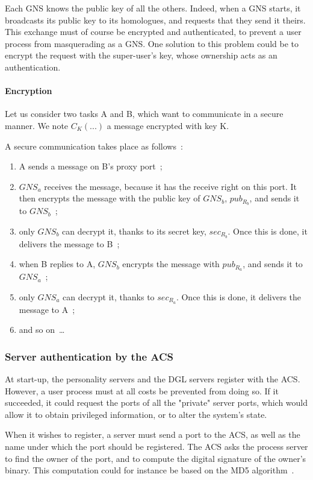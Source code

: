 Each GNS knows the public key of all the others. Indeed, when a GNS starts,
it broadcasts its public key to its homologues, and requests that they send it
theirs. This exchange must of course be encrypted and authenticated, 
to prevent a user 
process from masquerading as a GNS. One solution to this problem could be 
to encrypt the request with the super-user's key, whose ownership acts as
an authentication.

\paragraph{Encryption}

Let us consider two tasks A and B, which want to communicate in a secure 
manner. We note \(C_{K}(...)\) a message encrypted with key K.

A secure communication takes place as follows~: 
\begin{enumerate}
\item A sends a message on B's proxy port~;
\item \(GNS_{a}\) receives the message, because it has the receive right on 
this port. It then encrypts the message with the public key of \(GNS_{b}\), \(pub_{{R}_{b}}\), and sends it to \(GNS_{b}\)~;
\item only \(GNS_{b}\) can decrypt it, thanks to its secret key, 
\(sec_{{R}_{b}}\). Once this is done, it delivers the message to B~;
\item when B replies to A, \(GNS_{b}\) encrypts the message with 
\(pub_{{R}_{a}}\), and sends it to \(GNS_{a}\)~;
\item only \(GNS_{a}\) can decrypt it, thanks to \(sec_{{R}_{a}}\). 
Once this is done, it delivers the message to A~;
\item and so on~\dots
\end{enumerate}

\subsubsection{Server authentication by the ACS}

At start-up, the personality servers and the DGL servers register with 
the ACS. However, a user process must at all costs be prevented from
doing so. If it succeeded, it could request the ports of all the "private"
server ports, which would allow it to obtain privileged information, or to
alter the system's state.

When it wishes to register, a server must send a port to the ACS, as
well as the name under which the port should be registered. The ACS 
asks the process server to find the owner of the port, and to compute the
digital signature of the owner's binary. This computation could for instance
be based on the MD5 algorithm~\cite{Rivest92}.

